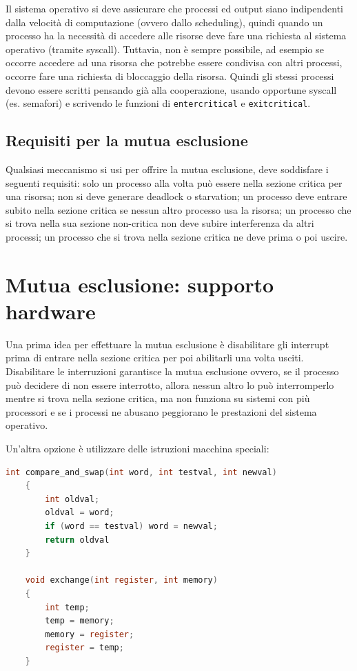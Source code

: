 Il sistema operativo si deve assicurare che processi ed output siano indipendenti dalla velocità di computazione (ovvero dallo scheduling), quindi quando un processo ha la necessità di accedere alle risorse deve fare una richiesta al sistema operativo (tramite syscall). Tuttavia, non è sempre possibile, ad esempio se occorre accedere ad una risorsa che potrebbe essere condivisa con altri processi, occorre fare una richiesta di bloccaggio della risorsa. Quindi gli stessi processi devono essere scritti pensando già alla cooperazione, usando opportune syscall (es. semafori) e scrivendo le funzioni di \verb|entercritical| e \verb|exitcritical|.

\subsection*{Requisiti per la mutua esclusione}
Qualsiasi meccanismo si usi per offrire la mutua esclusione, deve soddisfare i seguenti requisiti: solo un processo alla volta può essere nella sezione critica per una risorsa; non si deve generare deadlock o starvation; un processo deve entrare subito nella sezione critica se nessun altro processo usa la risorsa; un processo che si trova nella sua sezione non-critica non deve subire interferenza da altri processi; un processo che si trova nella sezione critica ne deve prima o poi uscire.

\section{Mutua esclusione: supporto hardware}
Una prima idea per effettuare la mutua esclusione è disabilitare gli interrupt prima di entrare nella sezione critica per poi abilitarli una volta usciti. Disabilitare le interruzioni garantisce la mutua esclusione ovvero, se il processo può decidere di non essere interrotto, allora nessun altro lo può interromperlo mentre si trova nella
sezione critica, ma non funziona su sistemi con più processori e se i processi ne abusano peggiorano le prestazioni del sistema operativo.

Un'altra opzione è utilizzare delle istruzioni macchina speciali:
\begin{lstlisting}[language=C]
    int compare_and_swap(int word, int testval, int newval)
    {
        int oldval;
        oldval = word;
        if (word == testval) word = newval;
        return oldval
    }

    void exchange(int register, int memory)
    {
        int temp;
        temp = memory;
        memory = register;
        register = temp;
    }
\end{lstlisting}


